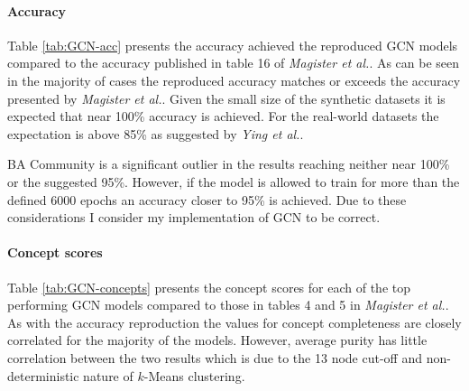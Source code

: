 \paragraph{Accuracy}

Table \ref{tab:GCN-acc} presents the accuracy achieved the reproduced GCN models compared to the accuracy published in table 16 of \textit{Magister et al.}\cite{magister2021gcexplainer}.
As can be seen in the majority of cases the reproduced accuracy matches or exceeds the accuracy presented by \textit{Magister et al.}.
Given the small size of the synthetic datasets it is expected that near 100\% accuracy is achieved.
For the real-world datasets the expectation is above 85\% as suggested by \textit{Ying et al.}\cite{ying2019gnnexplainer}.

BA Community is a significant outlier in the results reaching neither near 100\% or the suggested 95\%.
However, if the model is allowed to train for more than the defined 6000 epochs an accuracy closer to 95\% is achieved.
Due to these considerations I consider my implementation of GCN to be correct.

\paragraph{Concept scores}

Table \ref{tab:GCN-concepts} presents the concept scores for each of the top performing GCN models compared to those in tables 4 and 5 in \textit{Magister et al.}.
As with the accuracy reproduction the values for concept completeness are closely correlated for the majority of the models.
%
However, average purity has little correlation between the two results which is due to the 13 node cut-off and non-deterministic nature of $k$-Means clustering.


